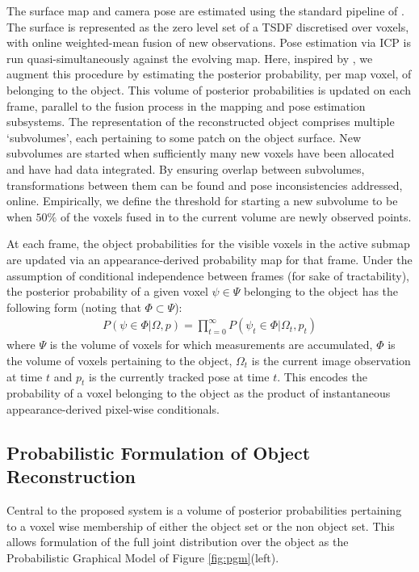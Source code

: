 The surface map and camera pose are estimated using the standard pipeline of \cite{Newcombe2011,Prisacariu2014}. The surface is represented as the zero level set of a TSDF discretised over voxels, with online weighted-mean fusion of new observations. Pose estimation via ICP is run quasi-simultaneously against the evolving map. Here, inspired by \cite{Kolev2006}, we augment this procedure by estimating the posterior probability, per map voxel, of belonging to the object. This volume of posterior probabilities is updated on each frame, parallel to the fusion process in the mapping and pose estimation subsystems. The representation of the reconstructed object comprises multiple `subvolumes', each pertaining to some patch on the object surface. New subvolumes are started when sufficiently many new voxels have been allocated and have had data integrated. By ensuring overlap between subvolumes, transformations between them can be found and pose inconsistencies addressed, online. Empirically, we define the threshold for starting a new subvolume to be when $50\%$ of the voxels fused in to the current volume are newly observed points.

At each frame, the object probabilities for the visible voxels in the active submap are updated via an appearance-derived probability map for that frame. Under the assumption of conditional independence between frames (for sake of tractability), the posterior probability of a given voxel $\psi \in \Psi$ belonging to the object has the following form (noting that $\Phi \subset \Psi$):
\begin{equation}
\label{eq:membership}
\begin{split}
P(\psi \in \Phi | \Omega, p) = \prod_{t=0}^{\infty} P(\psi_{t} \in \Phi | \Omega_{t}, p_{t})
\end{split}
\end{equation}
where $\Psi$ is the volume of voxels for which measurements are accumulated, $\Phi$ 
is the volume of voxels pertaining to the object, $\Omega_{t}$ is the current image observation at time $t$ and $p_{t}$ is the currently tracked pose at time $t$.
This encodes the probability of a voxel belonging to the object as the product of instantaneous appearance-derived pixel-wise conditionals.

\subsection{Probabilistic Formulation of Object Reconstruction}
Central to the proposed system is a volume of posterior probabilities pertaining to a voxel wise membership of either the 
object set or the non object set. This allows formulation of the full joint distribution over the object as the Probabilistic 
Graphical Model of Figure \ref{fig:pgm}(left).


